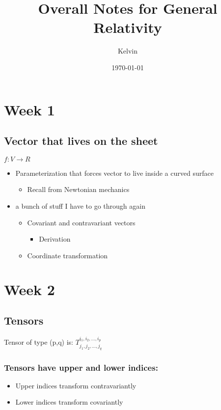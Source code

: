 \documentclass[11pt]{article}
\author{Kelvin}
\date{\today}
\title{Overall Notes for General Relativity}
\begin{document}
\maketitle
\tableofcontents



\section{Week 1}
\label{sec:org433dd05}
\subsection{Vector that lives on the sheet}
\label{sec:orgcc7c86b}

\(f: V \to R\)

\begin{itemize}
\item Parameterization that forces vector to live inside a curved surface
\begin{itemize}
\item Recall from Newtonian mechanics
\end{itemize}
\item a bunch of stuff I have to go through again 
\begin{itemize}
\item Covariant and contravariant vectors
\begin{itemize}
\item Derivation
\end{itemize}
\item Coordinate transformation
\end{itemize}
\end{itemize}

\section{Week 2}
\label{sec:org0f1d8da}
\subsection{Tensors}
\label{sec:org445a5b6}
Tensor of type (p,q) is: \(T^{i_1,i_2,...,i_p}_{j_1,j_2,...,j_q}\)
\subsubsection{Tensors have upper and lower indices:}
\label{sec:org464ca64}
\begin{itemize}
\item Upper indices transform contravariantly
\item Lower indices transform covariantly
\end{itemize}
\end{document}
